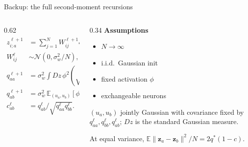 \documentclass[aspectratio=169,10pt]{beamer}
\newcommand{\E}{\mathbb{E}}
\begin{document}
\begin{frame}{Backup: the full second-moment recursions}
  \begingroup
  \small
  \begin{columns}[T,onlytextwidth]
    \begin{column}{0.62\textwidth}
      \begin{align*}
        z_{i;a}^{\ell+1}
          &=\sum_{j=1}^{N}W_{ij}^{\ell+1}\phi(z_{j;a}^{\ell})+b_i^{\ell+1},\\
        W_{ij}^{\ell}&\sim\mathcal N(0,\sigma_w^2/N),\quad
        b_i^{\ell}\sim\mathcal N(0,\sigma_b^2).
      \end{align*}
      \begin{align*}
        q_{aa}^{\ell+1}
          &=\sigma_w^2\!\int\! Dz\,\phi^2\!\left(\sqrt{q_{aa}^{\ell}}z\right)
            +\sigma_b^2,\\
        q_{ab}^{\ell+1}
          &=\sigma_w^2\,\E_{(u_a,u_b)}[\phi(u_a)\phi(u_b)]+\sigma_b^2,\\
        c_{ab}^{\ell}
          &=q_{ab}^{\ell}\big/\sqrt{q_{aa}^{\ell}q_{bb}^{\ell}}.
      \end{align*}
    \end{column}
    \begin{column}{0.34\textwidth}
      {\color{forest}\bfseries Assumptions}
      \begin{itemize}
        \setlength{\itemsep}{0.30em}
        \item \(N\to\infty\)
        \item i.i.d.\ Gaussian init
        \item fixed activation \(\phi\)
        \item exchangeable neurons
      \end{itemize}

      \vspace{0.50em}
      {\footnotesize \((u_a,u_b)\) jointly Gaussian with covariance fixed
      by \(q_{aa}^\ell,q_{bb}^\ell,q_{ab}^\ell\); \(Dz\) is the standard
      Gaussian measure.}

      \vspace{0.40em}
      {\footnotesize At equal variance,
      \(\E\|\mathbf z_a-\mathbf z_b\|^2/N=2q^*(1-c)\).}
    \end{column}
  \end{columns}
  \endgroup
\end{frame}
\end{document}
